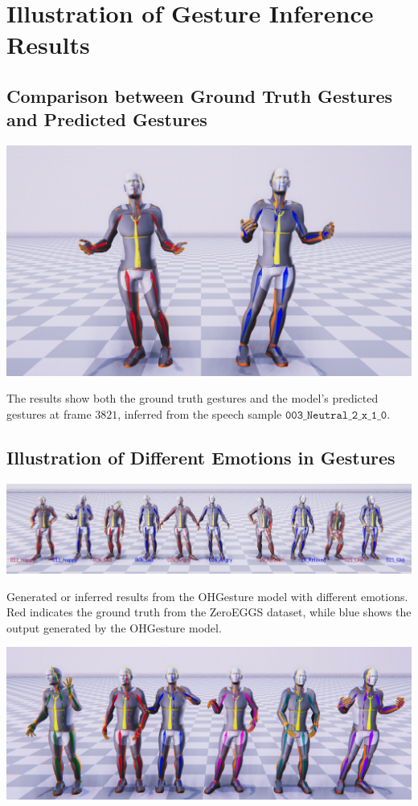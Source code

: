 \section{Illustration of Gesture Inference Results}
\label{appendix3}

\subsection{Comparison between Ground Truth Gestures and Predicted Gestures}

\begin{center}
	\centering
	\includegraphics[width=0.4\linewidth]{figures/GroundTruthCompare}
%		
\end{center}

The results show both the ground truth gestures and the model's predicted gestures at frame $3821$, inferred from the speech sample $\texttt{003\_Neutral\_2\_x\_1\_0}$.

\subsection{Illustration of Different Emotions in Gestures}

{
	\begin{center}
		\centering
			\includegraphics[width=0.5\linewidth]{figures/DifferenceEmotion}
%		
	\end{center}
}

Generated or inferred results from the OHGesture model with different emotions. Red indicates the ground truth from the ZeroEGGS dataset, while blue shows the output generated by the OHGesture model.

\begin{center}
	\centering
	\includegraphics[width=0.4\linewidth]{figures/ListOfEmotion}
	
%			
\end{center}

